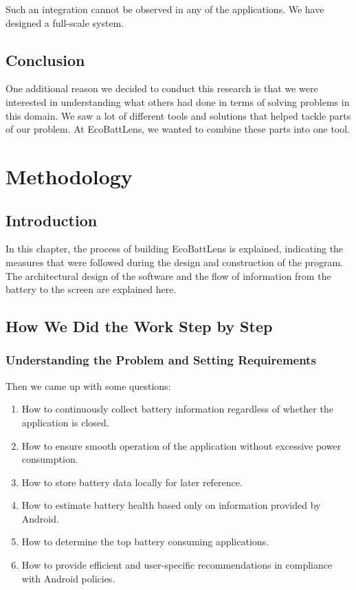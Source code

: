 \documentclass[12pt,a4paper]{report}
\begin{document}
Such an integration cannot be observed in any of the applications. We have designed a full-scale system.
\section{Conclusion}
One additional reason we decided to conduct this research is that we were interested in understanding what others had done in terms of solving problems in this domain. We saw a lot of different tools and solutions that helped tackle parts of our problem. At EcoBattLens, we wanted to combine these parts into one tool.
\chapter{Methodology}

\section{Introduction}
In this chapter, the process of building EcoBattLens is explained, indicating the measures that were followed during the design and construction of the program. The architectural design of the software and the flow of information from the battery to the screen are explained here.
\section{How We Did the Work Step by Step}
\subsection{Understanding the Problem and Setting Requirements}
Then we came up with some questions:

\begin{enumerate}
    \item How to continuously collect battery information regardless of whether the application is closed.
    \item How to ensure smooth operation of the application without excessive power consumption.
    \item How to store battery data locally for later reference.
    \item How to estimate battery health based only on information provided by Android.
    \item How to determine the top battery consuming applications.
    \item How to provide efficient and user-specific recommendations in compliance with Android policies.
\end{enumerate}
\end{document}
